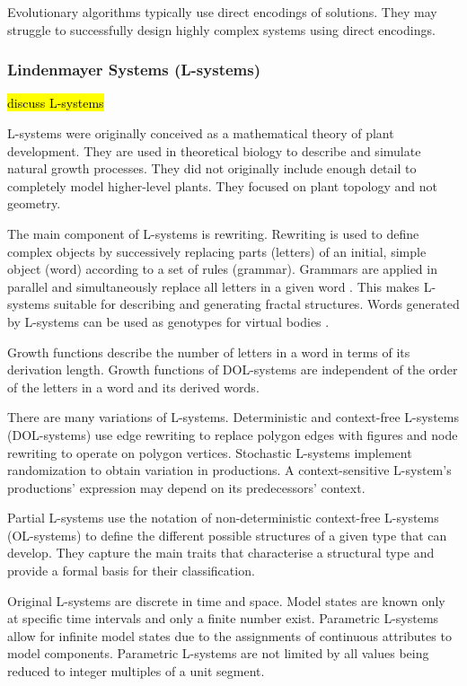 Evolutionary algorithms typically use direct encodings of solutions. They may struggle to successfully design highly complex systems using direct encodings. \cite{Hornby2001b}

\subsubsection{Lindenmayer Systems (L-systems)}

\hl{discuss L-systems}

L-systems were originally conceived as a mathematical theory of plant development. They are used in theoretical biology to describe and simulate natural growth processes. They did not originally include enough detail to completely model higher-level plants. They focused on plant topology and not geometry. \cite{Kolodziej2002,Prusinkiewicz2004}

The main component of L-systems is rewriting. Rewriting is used to define complex objects by successively replacing parts (letters) of an initial, simple object (word) according to a set of rules (grammar). Grammars are applied in parallel and simultaneously replace all letters in a given word \cite{Prusinkiewicz2004}. This makes L-systems suitable for describing and generating fractal structures. Words generated by L-systems can be used as genotypes for virtual bodies \cite{Kolodziej2002}.

Growth functions describe the number of letters in a word in terms of its derivation length. Growth functions of DOL-systems are independent of the order of the letters in a word and its derived words. \cite{Prusinkiewicz2004}

There are many variations of L-systems. Deterministic and context-free L-systems (DOL-systems) use edge rewriting to replace polygon edges with figures and node rewriting to operate on polygon vertices. Stochastic L-systems implement randomization to obtain variation in productions. A context-sensitive L-system's productions' expression may depend on its predecessors' context.  \cite{Prusinkiewicz2004}

Partial L-systems use the notation of non-deterministic context-free L-systems (OL-systems) to define the different possible structures of a given type that can develop. They capture the main traits that characterise a structural type and provide a formal basis for their classification. \cite{Prusinkiewicz2004}

Original L-systems are discrete in time and space. Model states are known only at specific time intervals and only a finite number exist. Parametric L-systems allow for infinite model states due to the assignments of continuous attributes to model components. Parametric L-systems are not limited by all values being reduced to integer multiples of a unit segment. \cite{Prusinkiewicz2004}

